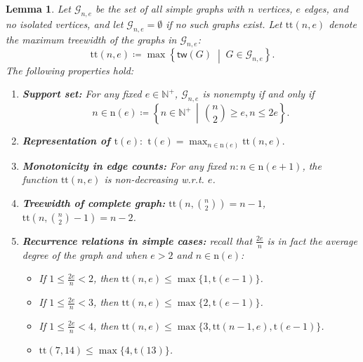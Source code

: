 \documentclass[sn-mathphys, natbib=false]{sn-jnl}
\theoremstyle{plain}
\newtheorem{lemma}{Lemma}
\theoremstyle{definition}
\newcommand{\treewidthp}[1]{\mathsf{tw}(#1)}
\newcommand{\graphset}{\mathcal{G}}
\newcommand{\graphsetne}[2]{\graphset_{#1,#2}}
\newcommand{\positivenaturals}{\mathbb{N}^+}
\begin{document}
\begin{bibunit}[agsm]
\begin{lemma}
\label{lem:property_of_tt}
Let $\graphsetne{n}{e}$ be the set of all simple graphs with $n$ vertices, $e$ edges, and no isolated vertices, and let $\graphsetne{n}{e} = \emptyset$ if no such graphs exist. Let $\mathrm{tt}(n, e)$ denote the maximum treewidth of the graphs in $\graphsetne{n}{e}$:
\begin{equation*}
\mathrm{tt}(n, e) \coloneqq \max\left\{ \treewidthp{G}\;\middle|\; G \in \graphsetne{n}{e} \right\}.
\end{equation*}
The following properties hold:
\begin{enumerate}
    \item \textbf{Support set:} For any fixed $e \in \positivenaturals $, $\graphsetne{n}{e}$ is nonempty if and only if 
    \begin{equation*}
        n \in \mathrm{n}(e) \coloneqq \left\{ n \in \positivenaturals \, \middle \vert\,  \binom{n}{2} \geq e,  n \leq 2e \right\}.
    \end{equation*}
    \item \textbf{Representation of $\mathrm{t}(e): $} $ \mathrm{t}(e) = \max_{n \in \mathrm{n}(e)} \mathrm{tt} (n, e).$
    \item \textbf{Monotonicity in edge counts:} For any fixed $n: n \in \mathrm{n}(e+1) $, the function $\mathrm{tt}(n, e)$ is non-decreasing w.r.t. $e$.
    \item \textbf{Treewidth of complete graph:} $\mathrm{tt}(n, \binom{n}{2}) =  n - 1$, $\mathrm{tt}(n, \binom{n}{2} - 1) = n - 2$.
    \item \textbf{Recurrence relations in simple cases:}  recall that $\frac{2e}{n}$ is in fact the average degree of the graph and when $e > 2$ and $n \in \mathrm{n} (e)$:
    \begin{itemize}
        \item[(1)] If $1 \leq \frac{2e}{n} < 2$, then $ \mathrm{tt}(n,e) \leq \max\{ 1, \mathrm{t}(e-1) \}$.
        \item[(2)] If $1 \leq \frac{2e}{n} < 3$, then $ \mathrm{tt}(n,e)  \leq \max\{ 2, \mathrm{t}(e-1) \} $.
        \item[(3)] If $1 \leq \frac{2e}{n} < 4$, then $ \mathrm{tt}(n,e)  \leq \max\{ 3, \mathrm{tt}(n - 1 ,e), \mathrm{t}(e-1) \}$.
        \item[(4)] $ \mathrm{tt}(7,14) \leq  \max\{ 4,  \mathrm{t}(13) \}$.
    \end{itemize}
\end{enumerate}
\end{lemma}


\end{bibunit}
\end{document}
